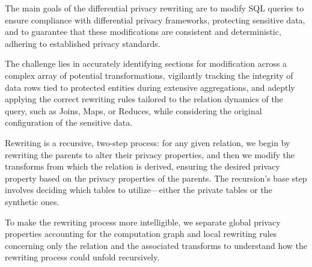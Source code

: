 \documentclass[letterpaper]{article} %
\begin{document}
The main goals of the differential privacy rewriting are to modify SQL queries to ensure compliance with differential privacy frameworks, protecting sensitive data, and to guarantee that these modifications are consistent and deterministic, adhering to established privacy standards.

The challenge lies in accurately identifying sections for modification across a complex array of potential transformations, vigilantly tracking the integrity of data rows tied to protected entities during extensive aggregations, and adeptly applying the correct rewriting rules tailored to the relation dynamics of the query, such as Joins, Maps, or Reduces, while considering the original configuration of the sensitive data.

Rewriting is a recursive, two-step process: for any given relation, we begin by rewriting the parents to alter their privacy properties, and then we modify the transforms from which the relation is derived, ensuring the desired privacy property based on the privacy properties of the parents. The recursion's base step involves deciding which tables to utilize—either the private tables or the synthetic ones.

To make the rewriting process more intelligible, we separate global privacy properties accounting for the computation graph and local rewriting rules concerning only the relation and the associated transforms to understand how the rewriting process could unfold recursively.
\end{document}

